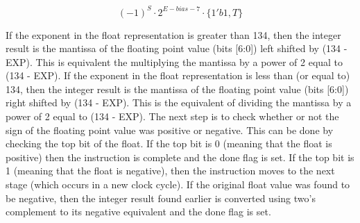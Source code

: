 \documentclass[conference]{IEEEtran}
\begin{document}
    \begin{equation}
        (-1)^S \cdot 2^{E-bias-7} \cdot \{1'b1,T\}
        \label{equ:float}
    \end{equation}

    If the exponent in the float representation is greater than 134, then the integer result is the mantissa of the floating point value (bits [6:0]) left shifted by (134 - EXP). This is equivalent the multiplying the mantissa by a power of 2 equal to (134 - EXP). If the exponent in the float representation is less than (or equal to) 134, then the integer result is the mantissa of the floating point value (bits [6:0]) right shifted by (134 - EXP). This is the equivalent of dividing the mantissa by a power of 2 equal to (134 - EXP). The next step is to check whether or not the sign of the floating point value was positive or negative. This can be done by checking the top bit of the float. If the top bit is 0 (meaning that the float is positive) then the instruction is complete and the done flag is set. If the top bit is 1 (meaning that the float is negative), then the instruction moves to the next stage (which occurs in a new clock cycle). If the original float value was found to be negative, then the integer result found earlier is converted using two's complement to its negative equivalent and the done flag is set.
    
\end{document}
